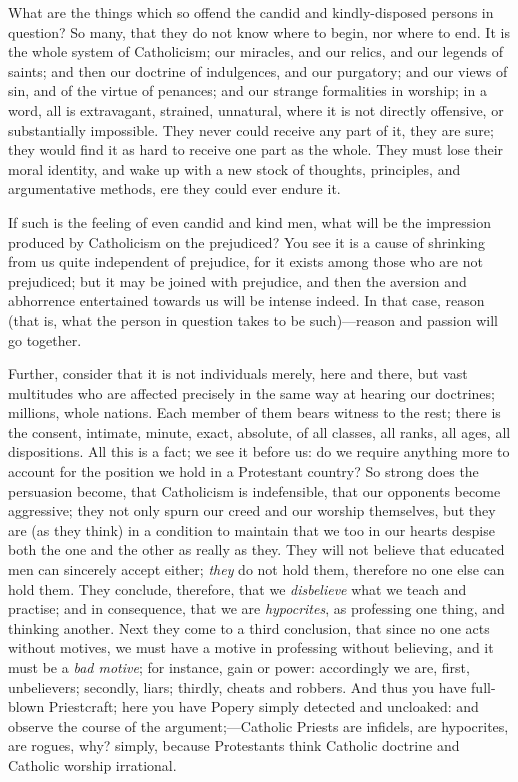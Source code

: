 What are the things which so offend the candid and
kindly-disposed persons in question? So many, that they
do not know where to begin, nor where to end. It is the
whole system of Catholicism; our miracles, and our
relics, and our legends of saints; and then our doctrine
of indulgences, and our purgatory; and our views of sin,
and of the virtue of penances; and our strange
formalities in worship; in a word, all is extravagant,
strained, unnatural, where it is not directly offensive,
or substantially impossible. They never could receive any
part of it, they are sure; they would find it as hard to
receive one part as the whole. They must lose their moral
identity, and wake up with a new stock of thoughts,
principles, and argumentative methods, ere they could
ever endure it.

If such is the feeling of even candid and kind men,
what will be the impression produced by Catholicism on
the prejudiced? You see it is a cause of shrinking from
us quite independent of prejudice, for it exists among
those who are not prejudiced; but it may be joined with
prejudice, and then the aversion and abhorrence
entertained towards us will be intense indeed. In that
case, reason (that is, what the person in question takes
to be such)—reason and passion will go together.

Further, consider that it is not individuals merely,
here and there, but vast multitudes who are affected
precisely in the same way at hearing our doctrines;
millions, whole nations. Each member of them bears
witness to the rest; there is the consent, intimate,
minute, exact, absolute, of all classes, all ranks, all
ages, all dispositions. All this is a fact; we see it
before us: do we require anything more to account for the
position we hold in a Protestant country? So strong does
the persuasion become, that Catholicism is indefensible,
that our opponents become aggressive; they not only spurn
our creed and our worship themselves, but they are (as
they think) in a condition to maintain that we too in our
hearts despise both the one and the other as really as
they. They will not believe that educated men can
sincerely accept either; \emph{they} do not hold them,
therefore no one else can hold them. They conclude,
therefore, that we \emph{disbelieve} what we teach and
practise; and in consequence, that we are \emph{hypocrites},
as professing one thing, and thinking another. Next they
come to a third conclusion, that since no one acts
without motives, we must have a motive in professing
without believing, and it must be a \emph{bad motive};
for instance, gain or power: accordingly we are, first,
unbelievers; secondly, liars; thirdly, cheats and
robbers. And thus you have full-blown Priestcraft; here
you have Popery simply detected and uncloaked: and
observe the course of the argument;—Catholic Priests
are infidels, are hypocrites, are rogues, why? simply,
because Protestants think Catholic doctrine and Catholic
worship irrational.

